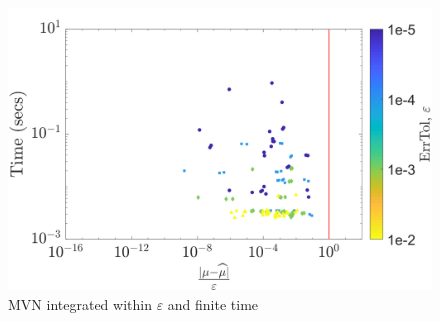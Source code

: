 \documentclass[twocolumn]{svjour3}          %
\begin{document}
\begin{figure}
	\centering
	\includegraphics[width=0.95\linewidth]{"figures/MVN guaranteed time 19-Jul-2018 00-01-41"}
	\caption[Guaranteed:]{MVN integrated within $\varepsilon$ and finite time}
	\label{fig:mvn-guaranteed-time}
\end{figure}
\end{document}

